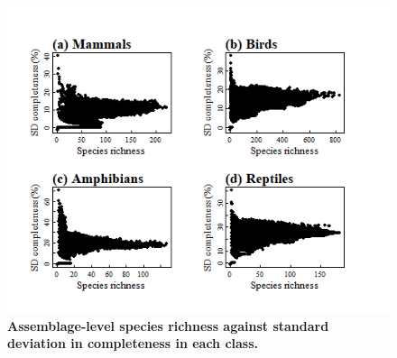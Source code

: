 \begin{figure}[h!]
\centering
\includegraphics[scale=0.8]{Supporting/Chapter2/Figures/Maps/sd_SR.png}
\caption[]{\textbf{Assemblage-level species richness against standard deviation in completeness in each class.}}
\label{SI2_sdcomp_sr}
\end{figure}

\clearpage
\newpage
\pagebreak

\clearpage
\newpage
\pagebreak

